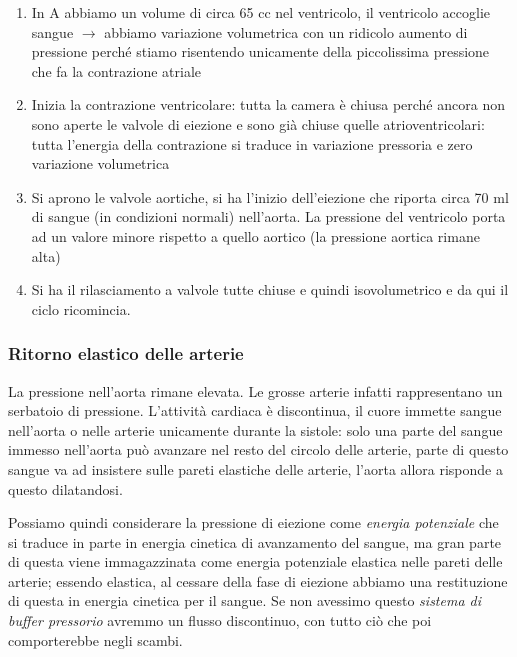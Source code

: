 \documentclass[a4paper,12pt]{article}
\begin{document}
\begin{enumerate} 
\item{In A abbiamo un volume di circa 65 cc nel ventricolo, il ventricolo accoglie sangue $\rightarrow$ abbiamo variazione volumetrica con un ridicolo aumento di pressione perché stiamo risentendo unicamente della piccolissima pressione che fa la contrazione atriale}
\item{Inizia la contrazione ventricolare: tutta la camera è chiusa perché ancora non sono aperte le valvole di eiezione e sono già chiuse quelle atrioventricolari: tutta l'energia della contrazione si traduce in variazione pressoria e zero variazione volumetrica}
\item{Si aprono le valvole aortiche, si ha l'inizio dell'eiezione che riporta circa 70 ml di sangue (in condizioni normali) nell'aorta. La pressione del ventricolo porta ad un valore minore rispetto a quello aortico (la pressione aortica rimane alta)} 
\item{Si ha il rilasciamento a valvole tutte chiuse e quindi isovolumetrico e da qui il ciclo ricomincia.}
\end{enumerate} 

\subsubsection{Ritorno elastico delle arterie} 
La pressione nell'aorta rimane elevata. Le grosse arterie infatti rappresentano un serbatoio di pressione. L'attività cardiaca è discontinua, il cuore immette sangue nell'aorta o nelle arterie unicamente durante la sistole: solo una parte del sangue immesso nell'aorta può avanzare nel resto del circolo delle arterie, parte di questo sangue va ad insistere sulle pareti elastiche delle arterie, l'aorta allora risponde a questo dilatandosi. 

Possiamo quindi considerare la pressione di eiezione come \emph{energia potenziale} che si traduce in parte in energia cinetica di avanzamento del sangue, ma gran parte di questa viene immagazzinata come energia potenziale elastica nelle pareti delle arterie; essendo elastica, al cessare della fase di eiezione abbiamo una restituzione di questa in energia cinetica per il sangue. Se non avessimo questo \emph{sistema di buffer pressorio} avremmo un flusso discontinuo, con tutto ciò che poi comporterebbe negli scambi.
\end{document}
